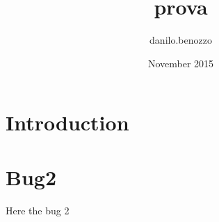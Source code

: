 \documentclass{article}
\title{prova}
\author{danilo.benozzo }
\date{November 2015}
\begin{document}
\maketitle

\section{Introduction}


\section{Bug2}
Here the bug 2
\end{document}
